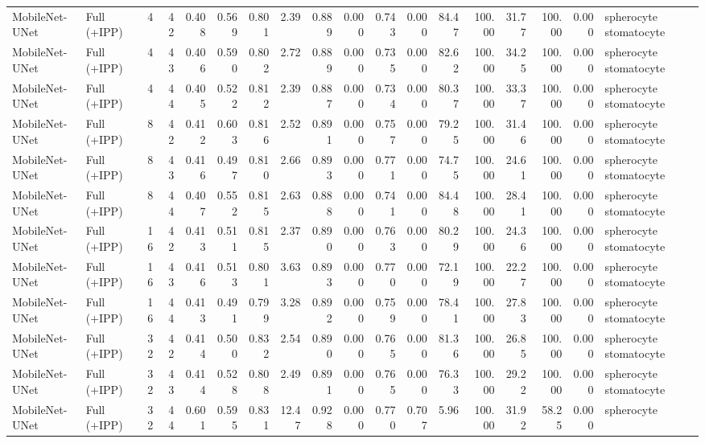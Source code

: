 \documentclass[10pt]{article}
\begin{document}
\begin{landscape}
{\begin{longtable}{l l r r r r r r r r r r r r r r r l}
MobileNet-UNet & Full (+IPP) & 4 & 42 & 0.408 & 0.569 & 0.801 & 2.39 & 0.889 & 0.000 & 0.743 & 0.000 & 84.47 & 100.00 & 31.77 & 100.00 & 0.000 & spherocyte stomatocyte \\
MobileNet-UNet & Full (+IPP) & 4 & 43 & 0.406 & 0.590 & 0.802 & 2.72 & 0.889 & 0.000 & 0.735 & 0.000 & 82.62 & 100.00 & 34.25 & 100.00 & 0.000 & spherocyte stomatocyte \\
MobileNet-UNet & Full (+IPP) & 4 & 44 & 0.405 & 0.522 & 0.812 & 2.39 & 0.887 & 0.000 & 0.734 & 0.000 & 80.37 & 100.00 & 33.37 & 100.00 & 0.000 & spherocyte stomatocyte \\
MobileNet-UNet & Full (+IPP) & 8 & 42 & 0.412 & 0.603 & 0.816 & 2.52 & 0.891 & 0.000 & 0.757 & 0.000 & 79.25 & 100.00 & 31.46 & 100.00 & 0.000 & spherocyte stomatocyte \\
MobileNet-UNet & Full (+IPP) & 8 & 43 & 0.416 & 0.497 & 0.810 & 2.66 & 0.893 & 0.000 & 0.771 & 0.000 & 74.75 & 100.00 & 24.61 & 100.00 & 0.000 & spherocyte stomatocyte \\
MobileNet-UNet & Full (+IPP) & 8 & 44 & 0.407 & 0.552 & 0.815 & 2.63 & 0.888 & 0.000 & 0.741 & 0.000 & 84.48 & 100.00 & 28.41 & 100.00 & 0.000 & spherocyte stomatocyte \\
MobileNet-UNet & Full (+IPP) & 16 & 42 & 0.413 & 0.511 & 0.815 & 2.37 & 0.890 & 0.000 & 0.763 & 0.000 & 80.29 & 100.00 & 24.36 & 100.00 & 0.000 & spherocyte stomatocyte \\
MobileNet-UNet & Full (+IPP) & 16 & 43 & 0.416 & 0.513 & 0.801 & 3.63 & 0.893 & 0.000 & 0.770 & 0.000 & 72.19 & 100.00 & 22.27 & 100.00 & 0.000 & spherocyte stomatocyte \\
MobileNet-UNet & Full (+IPP) & 16 & 44 & 0.413 & 0.491 & 0.799 & 3.28 & 0.892 & 0.000 & 0.759 & 0.000 & 78.41 & 100.00 & 27.83 & 100.00 & 0.000 & spherocyte stomatocyte \\
MobileNet-UNet & Full (+IPP) & 32 & 42 & 0.414 & 0.500 & 0.832 & 2.54 & 0.890 & 0.000 & 0.765 & 0.000 & 81.36 & 100.00 & 26.85 & 100.00 & 0.000 & spherocyte stomatocyte \\
MobileNet-UNet & Full (+IPP) & 32 & 43 & 0.414 & 0.528 & 0.808 & 2.49 & 0.891 & 0.000 & 0.765 & 0.000 & 76.33 & 100.00 & 29.22 & 100.00 & 0.000 & spherocyte stomatocyte \\
MobileNet-UNet & Full (+IPP) & 32 & 44 & 0.601 & 0.595 & 0.831 & 12.47 & 0.928 & 0.000 & 0.770 & 0.707 & 5.96 & 100.00 & 31.92 & 58.25 & 0.000 & spherocyte \\
\end{longtable}
}

\end{landscape}
\end{document}
